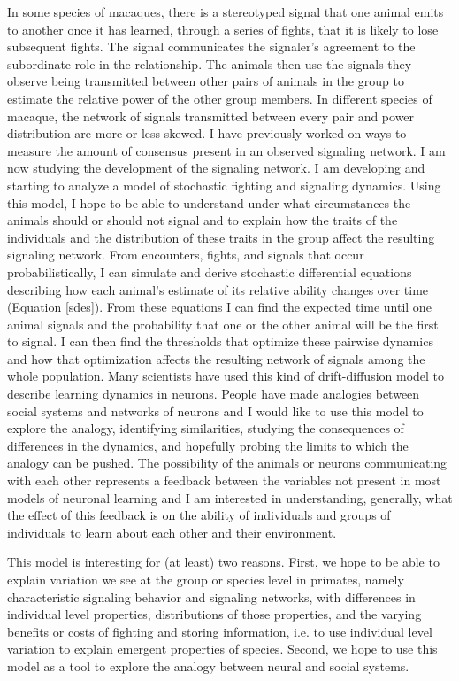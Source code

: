 \documentclass{article}
\begin{document}
In some species of macaques, there is a stereotyped signal that one animal emits to another once it has learned, through a series of fights, that it is likely to lose subsequent fights.  The signal communicates the signaler's agreement to the subordinate role in the relationship.  The animals then use the signals they observe being transmitted between other pairs of animals in the group to estimate the relative power of the other group members.  In different species of macaque, the network of signals transmitted between every pair and power distribution are more or less skewed.  I have previously worked on ways to measure the amount of consensus present in an observed signaling network.  I am now studying the development of the signaling network.  I am developing and starting to analyze a model of stochastic fighting and signaling dynamics.  Using this model, I hope to be able to understand under what circumstances the animals should or should not signal and to explain how the traits of the individuals and the distribution of these traits in the group affect the resulting signaling network.  From encounters, fights, and signals that occur probabilistically, I can simulate and derive stochastic differential equations describing how each animal's estimate of its relative ability changes over time (Equation \ref{sdes}).   From these equations I can find the expected time until one animal signals and the probability that one or the other animal will be the first to signal.  I can then find the thresholds that optimize these pairwise dynamics and how that optimization affects the resulting network of signals among the whole population.  Many scientists have used this kind of drift-diffusion model to describe learning dynamics in neurons.  People have made analogies between social systems and networks of neurons and I would like to use this model to explore the analogy, identifying similarities, studying the consequences of differences in the dynamics, and hopefully probing the limits to which the analogy can be pushed.  The possibility of the animals or neurons communicating with each other represents a feedback between the variables not present in most models of neuronal learning and I am interested in understanding, generally, what the effect of this feedback is on the ability of individuals and groups of individuals to learn about each other and their environment.

This model is interesting for (at least) two reasons.  First, we hope to be able to explain variation we see at the group or species level in primates, namely characteristic signaling behavior and signaling networks, with differences in individual level properties, distributions of those properties, and the varying benefits or costs of fighting and storing information, i.e. to use individual level variation to explain emergent properties of species.  Second, we hope to use this model as a tool to explore the analogy between neural and social systems.
\end{document}
